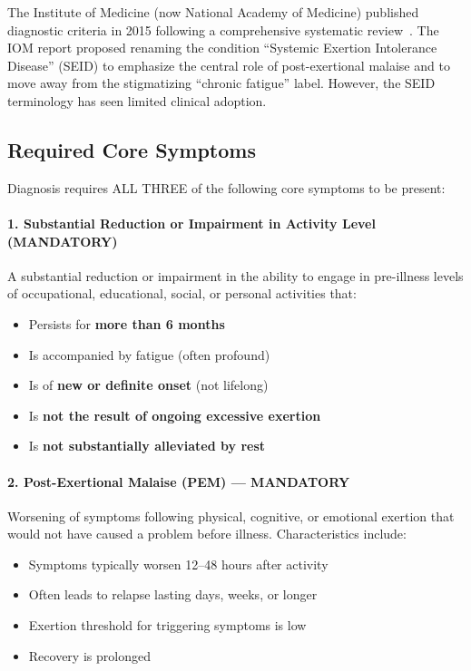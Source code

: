 \label{sec:iom}

The Institute of Medicine (now National Academy of Medicine) published diagnostic criteria in 2015 following a comprehensive systematic review~\cite{IOM2015}. The IOM report proposed renaming the condition ``Systemic Exertion Intolerance Disease'' (SEID) to emphasize the central role of post-exertional malaise and to move away from the stigmatizing ``chronic fatigue'' label. However, the SEID terminology has seen limited clinical adoption.

\subsection{Required Core Symptoms}

\begin{requirement}
\label{req:iom}
Diagnosis requires ALL THREE of the following core symptoms to be present:

\paragraph{1. Substantial Reduction or Impairment in Activity Level (MANDATORY)}

A substantial reduction or impairment in the ability to engage in pre-illness levels of occupational, educational, social, or personal activities that:
\begin{itemize}
    \item Persists for \textbf{more than 6 months}
    \item Is accompanied by fatigue (often profound)
    \item Is of \textbf{new or definite onset} (not lifelong)
    \item Is \textbf{not the result of ongoing excessive exertion}
    \item Is \textbf{not substantially alleviated by rest}
\end{itemize}

\paragraph{2. Post-Exertional Malaise (PEM) --- MANDATORY}

Worsening of symptoms following physical, cognitive, or emotional exertion that would not have caused a problem before illness. Characteristics include:
\begin{itemize}
    \item Symptoms typically worsen 12--48 hours after activity
    \item Often leads to relapse lasting days, weeks, or longer
    \item Exertion threshold for triggering symptoms is low
    \item Recovery is prolonged
\end{itemize}


\end{requirement}
